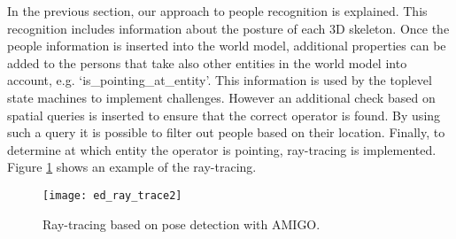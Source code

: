 In the previous section, our approach to people recognition is explained. This recognition includes information about the posture of each 3D skeleton. Once the people information is inserted into the world model, additional properties can be added to the persons that take also other entities in the world model into account, e.g. `is\_pointing\_at\_entity'. This information is used by the toplevel state machines to implement challenges.
However an additional check based on spatial queries is inserted to ensure that the correct operator is found. By using such a query it is possible to filter out people based on their location. Finally, to determine at which entity the operator is pointing, ray-tracing is implemented. Figure \ref{fig:ray_trace} shows an example of the ray-tracing.

\begin{figure}[H]
	\centering
    \texttt{[image: ed\_ray\_trace2]}
	\caption{Ray-tracing based on pose detection with AMIGO.}
	\label{fig:ray_trace}
\end{figure}
